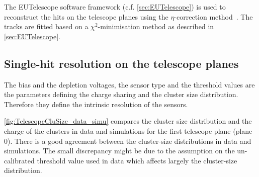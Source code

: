 The EUTelescope software framework (c.f. \cref{sec:EUTelescope}) is
used to reconstruct the hits on the telescope planes using the
$\eta$-correction method~\cite{Belau:1983eh}. The tracks are fitted
based on a $\chi^2$-minimisation method as described in
\cref{sec:EUTelescope}.

\subsection{Single-hit resolution on the telescope planes}

The bias and the depletion voltages, the sensor type and the threshold
values are the parameters defining the charge sharing and the cluster
size distribution. Therefore they define the intrinsic resolution of
the sensors.



\cref{fig:TelescopeCluSize_data_simu} compares the cluster size
distribution and the charge of the clusters in data and simulations
for the first telescope plane (plane 0). There is a good agreement
between the cluster-size distributions in data and simulations. The
small discrepancy might be due to the assumption on the un-calibrated
threshold value used in data which affects largely the cluster-size
distribution.


